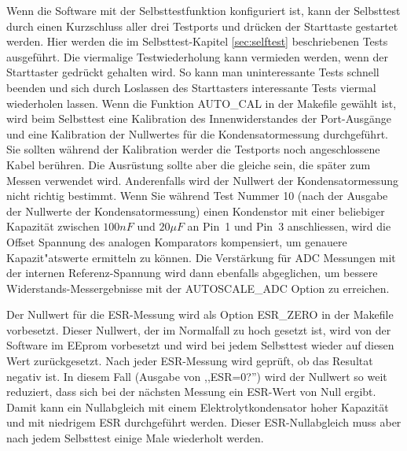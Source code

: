 Wenn die Software mit der Selbsttestfunktion konfiguriert ist, kann der Selbsttest durch einen Kurzschluss aller drei
Testports und drücken der Starttaste gestartet werden.
Hier werden die im Selbsttest-Kapitel \ref{sec:selftest} beschriebenen Tests ausgeführt. Die viermalige Testwiederholung
kann vermieden werden, wenn der Starttaster gedrückt gehalten wird. So kann man uninteressante Tests schnell beenden und
sich durch Loslassen des Starttasters interessante Tests viermal wiederholen lassen.
Wenn die Funktion AUTO\_CAL in der Makefile gewählt ist, wird beim Selbsttest
eine Kalibration des Innenwiderstandes der Port-Ausgänge und
eine Kalibration der Nullwertes für die Kondensatormessung durchgeführt.
Sie sollten während der Kalibration werder die Testports noch angeschlossene Kabel berühren. Die Ausrüstung
sollte aber die gleiche sein, die später zum Messen verwendet wird.
Anderenfalls wird der Nullwert der Kondensatormessung nicht richtig bestimmt.
Wenn Sie während Test Nummer 10 (nach der Ausgabe der Nullwerte der Kondensatormessung) einen Kondenstor mit einer beliebiger Kapazität zwischen \(100 nF\) und \(20 \mu F\) an Pin~1 und Pin~3  anschliessen,
wird die Offset Spannung des analogen Komparators kompensiert, um genauere Kapazit"atswerte ermitteln zu können.
Die Verstärkung für ADC Messungen mit der internen Referenz-Spannung wird dann ebenfalls abgeglichen, um
bessere Widerstands-Messergebnisse mit der AUTOSCALE\_ADC Option zu erreichen.


Der Nullwert für die ESR-Messung wird als Option ESR\_ZERO in der Makefile vorbesetzt. Dieser Nullwert, der im
Normalfall zu hoch gesetzt ist, wird von der Software im EEprom vorbesetzt und wird bei jedem Selbsttest
wieder auf diesen Wert zurückgesetzt.
Nach jeder ESR-Messung wird geprüft, ob das Resultat negativ ist. In diesem Fall (Ausgabe von ,,ESR=0?'') wird der Nullwert so weit
reduziert, dass sich bei der nächsten Messung ein ESR-Wert von Null ergibt. Damit kann ein Nullabgleich mit
einem Elektrolytkondensator hoher Kapazität und mit niedrigem ESR durchgeführt werden.
Dieser ESR-Nullabgleich muss aber nach jedem Selbsttest einige Male wiederholt werden.
